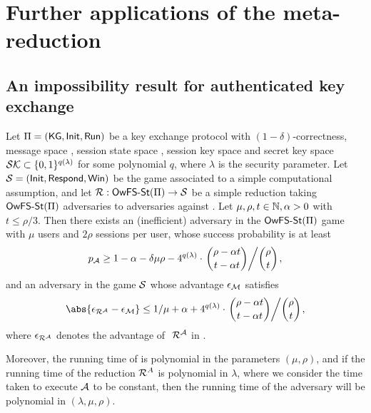 
\section{Further applications of the meta-reduction}

\subsection{An impossibility result for authenticated key exchange}

\begin{theorem}\label{thm:owfsst}
  Let \(\mathrm{\Pi}{} = (\mathsf{KG}, \mathsf{Init}, \mathsf{Run})\) be a key exchange protocol
  with \((1-\delta)\)-correctness,
  message space \setM, session state space \setST, session key space \keyspace
  and secret key space \(\mathcal{SK} \subset \{0,1\}^{q(\lambda)}\) for some polynomial \(q\),
  where \(\lambda\) is the security parameter.
  Let \(\mathcal{S} = (\mathsf{Init}, \mathsf{Respond}, \mathsf{Win})\) be the game associated to a simple computational assumption,
  and let \(\redR : \OwFSst(\prot) \to \Simple\) be a simple reduction
  taking \(\mathsf{OwFS}\text{-}\mathsf{St}(\mathrm{\Pi})\) adversaries to adversaries against \Simple.
  Let \(\mu,\rho,t \in \mathbb{N}, \alpha > 0\) with \(t \le \rho/3\).
  Then there exists an (inefficient) adversary \advA in the \(\mathsf{OwFS}\text{-}\mathsf{St}(\mathrm{\Pi})\) game
  with \(\mu\) users and \(2\rho\) sessions per user, whose success probability is at least
  \begin{equation}\label{ineq:owfsst:A}
    p_{\advA} \ge 1 - \alpha - \delta \mu \rho
    - 4^{q(\lambda)} \cdot \left. \binom{\rho - \alpha t}{t - \alpha t} \middle/ \binom{\rho}{t} \right.,
  \end{equation}
  and an adversary \redM in the game \(\mathcal{S}\)
  whose advantage \(\epsilon_{\mathcal{M}}\) satisfies
  \begin{equation}\label{ineq:owfsst:M}
    \abs{\epsilon_{\redR^{\advA}} - \epsilon_{\redM}} \le 1/\mu + \alpha
    + 4^{q(\lambda)} \cdot \left. \binom{\rho - \alpha t}{t - \alpha t} \middle/ \binom{\rho}{t} \right.,
  \end{equation}
  where \(\epsilon_{\redR^{\advA}}\) denotes the advantage of \(\text{ }\redR^{\advA}\) in \Simple.

  Moreover, the running time of \redM is polynomial in the parameters \((\mu, \rho)\),
  and if the running time of the reduction \(\redR^{A}\) is polynomial in \(\lambda\),
  where we consider the time taken to execute \(\mathcal{A}\) to be constant,
  then the running time of the adversary \redM will be polynomial in \((\lambda,\mu,\rho)\).
\end{theorem}

